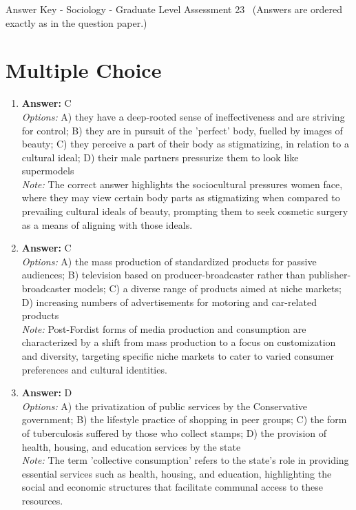 \documentclass[12pt]{article}
\begin{document}
\begin{center}
Answer Key - Sociology - Graduate Level Assessment 23 \
\small (Answers are ordered exactly as in the question paper.)
\end{center}

\section*{Multiple Choice}
\begin{enumerate}[label=\arabic*.]
\item \textbf{Answer:} C
\\ \textit{Options:} A) they have a deep-rooted sense of ineffectiveness and are striving for control; B) they are in pursuit of the 'perfect' body, fuelled by images of beauty; C) they perceive a part of their body as stigmatizing, in relation to a cultural ideal; D) their male partners pressurize them to look like supermodels
\\ \textit{Note:} The correct answer highlights the sociocultural pressures women face, where they may view certain body parts as stigmatizing when compared to prevailing cultural ideals of beauty, prompting them to seek cosmetic surgery as a means of aligning with those ideals.
\item \textbf{Answer:} C
\\ \textit{Options:} A) the mass production of standardized products for passive audiences; B) television based on producer-broadcaster rather than publisher-broadcaster models; C) a diverse range of products aimed at niche markets; D) increasing numbers of advertisements for motoring and car-related products
\\ \textit{Note:} Post-Fordist forms of media production and consumption are characterized by a shift from mass production to a focus on customization and diversity, targeting specific niche markets to cater to varied consumer preferences and cultural identities.
\item \textbf{Answer:} D
\\ \textit{Options:} A) the privatization of public services by the Conservative government; B) the lifestyle practice of shopping in peer groups; C) the form of tuberculosis suffered by those who collect stamps; D) the provision of health, housing, and education services by the state
\\ \textit{Note:} The term 'collective consumption' refers to the state's role in providing essential services such as health, housing, and education, highlighting the social and economic structures that facilitate communal access to these resources.

\end{enumerate}
\end{document}
